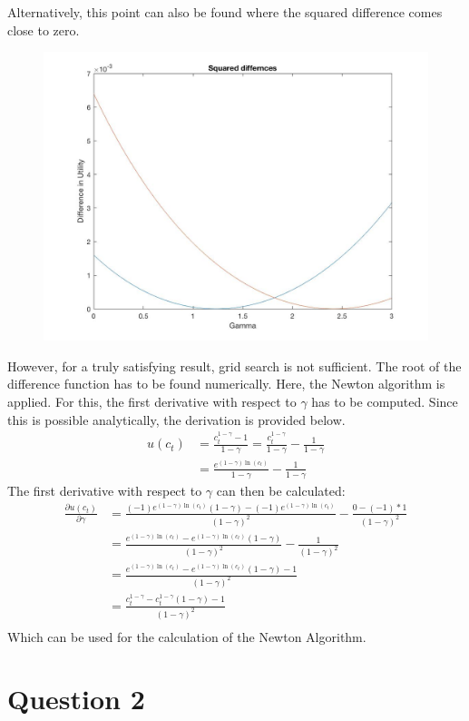 \documentclass{article}
\begin{document}
Alternatively, this point can also be found where the squared difference comes close to zero. \begin{figure}[h]
\includegraphics[width = \textwidth, keepaspectratio]{PS5Q2Sub3_Squared_Diff.jpg}
\end{figure}
However, for a truly satisfying result, grid search is not sufficient. The root of the difference function has to be found numerically. Here, the Newton algorithm is applied. For this, the first derivative with respect to $\gamma$ has to be computed. Since this is possible analytically, the derivation is provided below.
\begin{align}
u(c_t) &= \frac{c_t^{1-\gamma}-1}{1- \gamma} = \frac{c_t^{1-\gamma}}{1- \gamma} -\frac{1}{1- \gamma}\\
&= \frac{e^{(1-\gamma) \ln (c_t)}}{1- \gamma} -\frac{1}{1- \gamma}
\end{align}
The first derivative with respect to $\gamma$ can then be calculated:
\begin{align}
\frac{ \partial u(c_t)}{\partial \gamma} &= \frac{(-1)e^{(1-\gamma) \ln (c_t)} (1- \gamma)- (-1)e^{(1-\gamma) \ln (c_t)}}{(1- \gamma)^2} - \frac{0 - (-1)*1}{(1- \gamma)^2} \\
&= \frac{e^{(1-\gamma) \ln (c_t)}-e^{(1-\gamma) \ln (c_t)} (1- \gamma)}{(1- \gamma)^2} - \frac{1}{(1- \gamma)^2} \\
&= \frac{e^{(1-\gamma) \ln (c_t)}-e^{(1-\gamma) \ln (c_t)} (1- \gamma)-1}{(1- \gamma)^2} \\
&= \frac{c_t^{1- \gamma}-c_t^{1- \gamma} (1- \gamma)-1}{(1- \gamma)^2} \\  
\end{align}
Which can be used for the calculation of the Newton Algorithm.
\section{Question 2}
\end{document}
